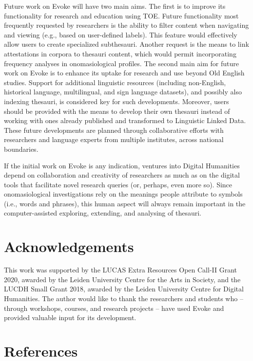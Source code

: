 Future work on Evoke will have two main aims. The first is to improve its functionality for research and education using TOE. Future functionality most frequently requested by researchers is the ability to filter content when navigating and viewing (e.g., based on user-defined labels). This feature would effectively allow users to create specialized subthesauri. Another request is the means to link attestations in corpora to thesauri content, which would permit incorporating frequency analyses in onomasiological profiles. The second main aim for future work on Evoke is to enhance its uptake for research and use beyond Old English studies. Support for additional linguistic resources (including non-English, historical language, multilingual, and sign language datasets), and possibly also indexing thesauri, is considered key for such developments. Moreover, users should be provided with the means to develop their own thesauri instead of working with ones already published and transformed to Linguistic Linked Data. These future developments are planned through collaborative efforts with researchers and language experts from multiple institutes, across national boundaries. 

If the initial work on Evoke is any indication, ventures into Digital Humanities depend on collaboration and creativity of researchers as much as on the digital tools that facilitate novel research queries (or, perhaps, even more so). Since onomasiological investigations rely on the meanings people attribute to symbols (i.e., words and phrases), this human aspect will always remain important in the computer-assisted exploring, extending, and analysing of thesauri.

\section{Acknowledgements} %
This work was supported by the LUCAS Extra Resources Open Call-II Grant 2020, awarded by the Leiden University Centre for the Arts in Society, and the LUCDH Small Grant 2018, awarded by the Leiden University Centre for Digital Humanities. The author would like to thank the researchers and students who – through workshops, courses, and research projects – have used Evoke and provided valuable input for its development.

\section{References} %

